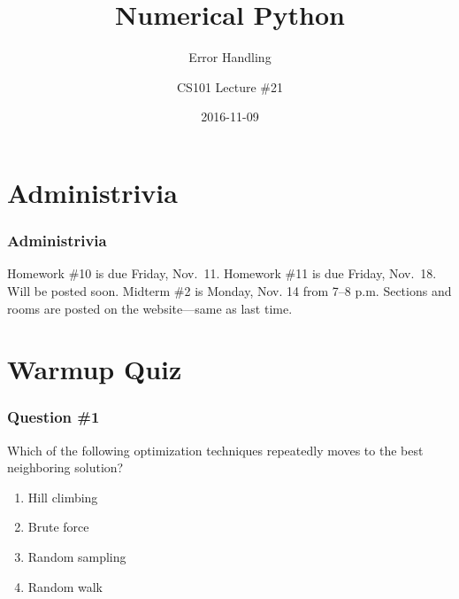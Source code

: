 \documentclass[11pt]{beamer}
\title{Numerical Python}
\subtitle{Error Handling}
\author{CS101 Lecture \#21}
\date{2016-11-09}
\begin{document}
  \setcounter{showProgressBar}{0}
  \setcounter{showSlideNumbers}{0}

\frame{\titlepage}

\setcounter{framenumber}{0}
\setcounter{showProgressBar}{1}
\setcounter{showSlideNumbers}{1}

\section{Administrivia}

\begin{frame}
  \frametitle{Administrivia}
  \Enlarge

  \begin{itemize}
  \myitem  Homework \#10 is due Friday, Nov.\ 11.
  \myitem  Homework \#11 is due Friday, Nov.\ 18.  \textcolor{CS101PureBase}{Will be posted soon.}
  \myitem  Midterm \#2 is Monday, Nov. 14 from 7--8 p.m.  Sections and rooms are posted on the website---same as last time.

  \end{itemize}
\end{frame}

\section{Warmup Quiz}

\begin{frame}[fragile]
  \frametitle{Question \#1}
  \Enlarge

Which of the following optimization techniques repeatedly moves to the best neighboring solution?

  \begin{enumerate}[label=\Alph*]
    \item  Hill climbing
    \item  Brute force
    \item  Random sampling
    \item  Random walk
  \end{enumerate}
\end{frame}
\end{document}
